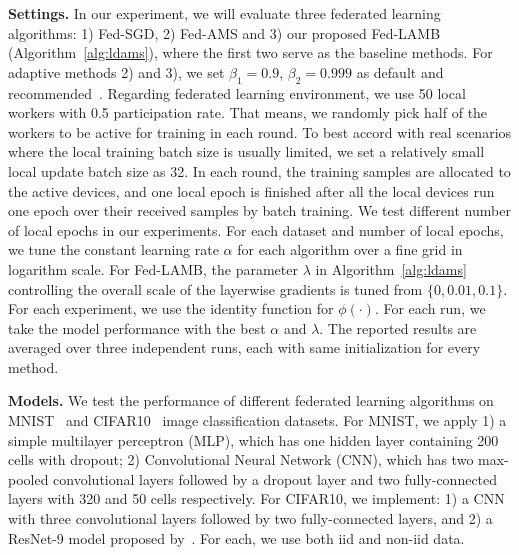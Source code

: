 \documentclass[11pt]{article}
\begin{document}
\vspace{0.05in}
\noindent\textbf{Settings.} In our experiment, we will evaluate three federated learning algorithms: 1) Fed-SGD, 2) Fed-AMS and 3) our proposed Fed-LAMB (Algorithm~\ref{alg:ldams}), where the first two serve as the baseline methods. For adaptive methods 2) and 3), we set $\beta_1=0.9$, $\beta_2=0.999$ as default and recommended~\citep{RKK18}. Regarding federated learning environment, we use 50 local workers with 0.5 participation rate. That means, we randomly pick half of the workers to be active for training in each round. To best accord with real scenarios where the local training batch size is usually limited, we set a relatively small local update batch size as 32. In each round, the training samples are allocated to the active devices, and one local epoch is finished after all the local devices run one epoch over their received samples by batch training. We test different number of local epochs in our experiments. For each dataset and number of local epochs, we tune the constant learning rate $\alpha$ for each algorithm over a fine grid in logarithm scale. For Fed-LAMB, the parameter $\lambda$ in Algorithm~\ref{alg:ldams} controlling the overall scale of the layerwise gradients is tuned from $\{0,0.01,0.1\}$. 
For each experiment, we use the identity function for $\phi(\cdot)$.
For each run, we take the model performance with the best $\alpha$ and $\lambda$. The reported results are averaged over three independent runs, each with same initialization for every method.

\vspace{0.05in}
\noindent\textbf{Models.} We test the performance of different federated learning algorithms on MNIST~\citep{lecun1998mnist} and CIFAR10~\citep{krizhevsky2009learning} image classification datasets. For MNIST, we apply 1) a simple multilayer perceptron (MLP), which has one hidden layer containing 200 cells with dropout; 2) Convolutional Neural Network (CNN), which has two max-pooled convolutional layers followed by a dropout layer and two fully-connected layers with 320 and 50 cells respectively. For CIFAR10, we implement: 1) a CNN with three convolutional layers followed by two fully-connected layers, and 2) a ResNet-9 model proposed by~\citep{Proc:He-resnet16}. 
For each, we use both iid and non-iid data.
\end{document}
